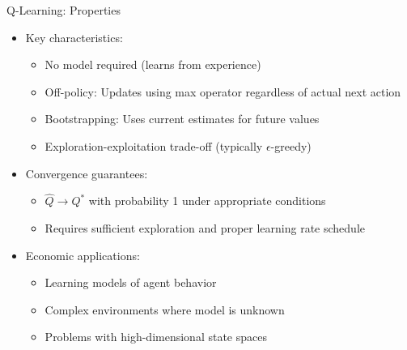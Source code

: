 \documentclass[10pt]{beamer}
\begin{document}
\begin{frame}{Q-Learning: Properties}
    \begin{itemize}
        \item Key characteristics:
        \begin{itemize}
            \item No model required (learns from experience)
            \item Off-policy: Updates using max operator regardless of actual next action
            \item Bootstrapping: Uses current estimates for future values
            \item Exploration-exploitation trade-off (typically $\epsilon$-greedy)
        \end{itemize}
        \vspace{0.2cm}
        \item Convergence guarantees:
        \begin{itemize}
            \item $\hat{Q} \to Q^*$ with probability 1 under appropriate conditions
            \item Requires sufficient exploration and proper learning rate schedule
        \end{itemize}
        \vspace{0.2cm}
        \item Economic applications:
        \begin{itemize}
            \item Learning models of agent behavior
            \item Complex environments where model is unknown
            \item Problems with high-dimensional state spaces
        \end{itemize}
    \end{itemize}
\end{frame}

\end{document}
